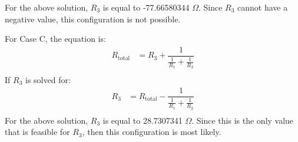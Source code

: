 \documentclass [12pt, letterpaper, twoside] {article}
\begin{document}
\noindent
For the above solution, \(R_{3}\) is equal to -77.66580344 \(\Omega\). Since \(R_{3}\) cannot have a negative value, this configuration is not possible.

\noindent
For Case C, the equation is:
\begin{equation*}
  \begin{split}
    R_{\text{total}} &= R_{3} + \dfrac{1}{\tfrac{1}{R_{1}} + \tfrac{1}{R_{2}}} \\
  \end{split}
\end{equation*}
If \(R_{3}\) is solved for:
\begin{equation*}
  \begin{split}
    R_{3} &= R_{\text{total}} - \dfrac{1}{\tfrac{1}{R_{1}} + \tfrac{1}{R_{2}}} \\
  \end{split}
\end{equation*}
For the above solution, \(R_{3}\) is equal to 28.7307341 \(\Omega\). Since this is the only value that is feasible for \(R_{3}\), then this configuration is most likely.
\end{document}
